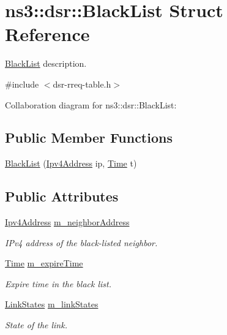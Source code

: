 \hypertarget{structns3_1_1dsr_1_1BlackList}{}\section{ns3\+:\+:dsr\+:\+:Black\+List Struct Reference}
\label{structns3_1_1dsr_1_1BlackList}


\hyperlink{structns3_1_1dsr_1_1BlackList}{Black\+List} description.  




{\ttfamily \#include $<$dsr-\/rreq-\/table.\+h$>$}



Collaboration diagram for ns3\+:\+:dsr\+:\+:Black\+List\+:
\subsection*{Public Member Functions}
\begin{DoxyCompactItemize}
\item 
\hyperlink{structns3_1_1dsr_1_1BlackList_a9c00cdcd12503e4375b860bac25b77f6}{Black\+List} (\hyperlink{classns3_1_1Ipv4Address}{Ipv4\+Address} ip, \hyperlink{classns3_1_1Time}{Time} t)
\end{DoxyCompactItemize}
\subsection*{Public Attributes}
\begin{DoxyCompactItemize}
\item 
\hyperlink{classns3_1_1Ipv4Address}{Ipv4\+Address} \hyperlink{structns3_1_1dsr_1_1BlackList_ae21744867af10f1c0ad690ad9d58a420}{m\+\_\+neighbor\+Address}
\begin{DoxyCompactList}\small\item\em I\+Pv4 address of the black-\/listed neighbor. \end{DoxyCompactList}\item 
\hyperlink{classns3_1_1Time}{Time} \hyperlink{structns3_1_1dsr_1_1BlackList_a08aa777cde67ca34b34d7d4b0d8dd3de}{m\+\_\+expire\+Time}
\begin{DoxyCompactList}\small\item\em Expire time in the black list. \end{DoxyCompactList}\item 
\hyperlink{namespacens3_1_1dsr_ac9e5787558472a1653f08327f988425f}{Link\+States} \hyperlink{structns3_1_1dsr_1_1BlackList_a32ff5b707885a62941a6f9381fb3daf3}{m\+\_\+link\+States}
\begin{DoxyCompactList}\small\item\em State of the link. \end{DoxyCompactList}\end{DoxyCompactItemize}


